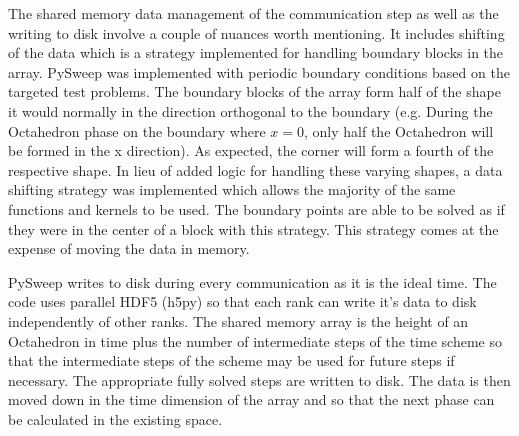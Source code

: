 \documentclass[review]{elsarticle}
\begin{document}
\par The shared memory data management of the communication step as well as the writing to disk involve a couple of nuances worth mentioning. It includes shifting of the data which is a strategy implemented for handling boundary blocks in the array. PySweep was implemented with periodic boundary conditions based on the targeted test problems. The boundary blocks of the array form half of the shape it would normally in the direction orthogonal to the boundary (e.g. During the Octahedron phase on the boundary where $x=0$, only half the Octahedron will be formed in the x direction). As expected, the corner will form a fourth of the respective shape. In lieu of added logic for handling these varying shapes, a data shifting strategy was implemented which allows the majority of the same functions and kernels to be used. The boundary points are able to be solved as if they were in the center of a block with this strategy. This strategy comes at the expense of moving the data in memory.

\par PySweep writes to disk during every communication as it is the ideal time. The code uses parallel HDF5 (h5py) so that each rank can write it's data to disk independently of other ranks. The shared memory array is the height of an Octahedron in time plus the number of intermediate steps of the time scheme so that the intermediate steps of the scheme may be used for future steps if necessary. The appropriate fully solved steps are written to disk. The data is then moved down in the time dimension of the array and so that the next phase can be calculated in the existing space.
\end{document}

